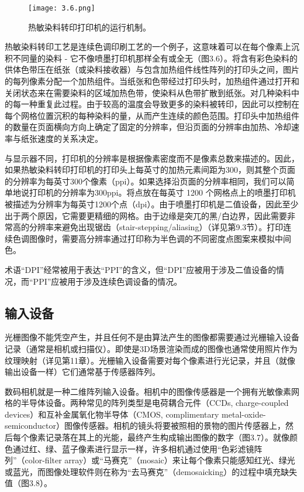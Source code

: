 \documentclass[lang=cn,12pt]{elegantbook}
\begin{document}
\begin{figure}[htb]
  \centering
  \texttt{[image: 3.6.png]}
  \caption{热敏染料转印打印机的运行机制。}
  \end{figure}

热敏染料转印工艺是连续色调印刷工艺的一个例子，这意味着可以在每个像素上沉积不同量的染料 - 它不像喷墨打印机那样全有或全无（图3.6）。将含有彩色染料的供体色带压在纸张（或染料接收器）与包含加热组件线性阵列的打印头之间，图片的每列像素分配一个加热组件。当纸张和色带经过打印头时，加热组件通过打开和关闭状态来在需要染料的区域加热色带，使染料从色带扩散到纸张。对几种染料中的每一种重复此过程。由于较高的温度会导致更多的染料被转印，因此可以控制在每个网格位置沉积的每种染料的量，从而产生连续的颜色范围。打印头中加热组件的数量在页面横向方向上确定了固定的分辨率，但沿页面的分辨率由加热、冷却速率与纸张速度的关系决定。

与显示器不同，打印机的分辨率是根据像素密度而不是像素总数来描述的。因此，如果热敏染料转印打印机的打印头上每英寸的加热元素间距为300，则其整个页面的分辨率为每英寸300个像素（ppi）。如果选择沿页面的分辨率相同，我们可以简单地说打印机的分辨率为300ppi。将点放在每英寸 1200 个网格点上的喷墨打印机被描述为分辨率为每英寸1200个点（dpi）。由于喷墨打印机是二值设备，因此至少出于两个原因，它需要更精细的网格。由于边缘是突兀的黑/白边界，因此需要非常高的分辨率来避免出现锯齿（stair-stepping/aliasing）（详见第9.3节）。打印连续色调图像时，需要高分辨率通过打印称为半色调的不同密度点图案来模拟中间色。

\begin{note}
术语“DPI”经常被用于表达“PPI”的含义，但“DPI”应被用于涉及二值设备的情况，而“PPI”应被用于涉及连续色调设备的情况。
\end{note}

\subsection{输入设备}

光栅图像不能凭空产生，并且任何不是由算法产生的图像都需要通过光栅输入设备记录（通常是相机或扫描仪）。即使是3D场景渲染而成的图像也通常使用照片作为纹理映射（详见第11章）。光栅输入设备需要对每个像素进行光记录，并且（就像输出设备一样）它们通常基于传感器阵列。

数码相机就是一种二维阵列输入设备。相机中的图像传感器是一个拥有光敏像素网格的半导体设备。两种常见的阵列类型是电荷耦合元件（CCDs, charge-coupled devices）和互补金属氧化物半导体（CMOS, complimentary metal-oxide-semiconductor）图像传感器。相机的镜头将要被照相的景物的图片传感器上，然后每个像素记录落在其上的光能，最终产生构成输出图像的数字（图3.7）。就像颜色通过红、绿、蓝子像素进行显示一样，许多相机通过使用“色彩滤镜阵列”（color-filter array）或“马赛克”（mosaic）来让每个像素只能感知红光、绿光或蓝光，而图像处理软件则在称为“去马赛克”（demosaicking）的过程中填充缺失值（图3.8）。
\end{document}
